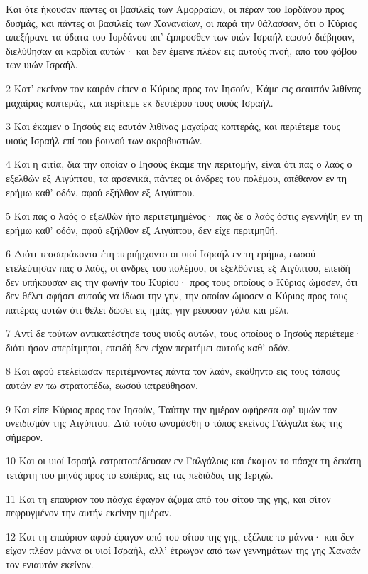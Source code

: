 \par Και ότε ήκουσαν πάντες οι βασιλείς των Αμορραίων, οι πέραν του Ιορδάνου προς δυσμάς, και πάντες οι βασιλείς των Χαναναίων, οι παρά την θάλασσαν, ότι ο Κύριος απεξήρανε τα ύδατα του Ιορδάνου απ' έμπροσθεν των υιών Ισραήλ εωσού διέβησαν, διελύθησαν αι καρδίαι αυτών· και δεν έμεινε πλέον εις αυτούς πνοή, από του φόβου των υιών Ισραήλ.
\par 2 Κατ' εκείνον τον καιρόν είπεν ο Κύριος προς τον Ιησούν, Κάμε εις σεαυτόν λιθίνας μαχαίρας κοπτεράς, και περίτεμε εκ δευτέρου τους υιούς Ισραήλ.
\par 3 Και έκαμεν ο Ιησούς εις εαυτόν λιθίνας μαχαίρας κοπτεράς, και περιέτεμε τους υιούς Ισραήλ επί του βουνού των ακροβυστιών.
\par 4 Και η αιτία, διά την οποίαν ο Ιησούς έκαμε την περιτομήν, είναι ότι πας ο λαός ο εξελθών εξ Αιγύπτου, τα αρσενικά, πάντες οι άνδρες του πολέμου, απέθανον εν τη ερήμω καθ' οδόν, αφού εξήλθον εξ Αιγύπτου.
\par 5 Και πας ο λαός ο εξελθών ήτο περιτετμημένος· πας δε ο λαός όστις εγεννήθη εν τη ερήμω καθ' οδόν, αφού εξήλθον εξ Αιγύπτου, δεν είχε περιτμηθή.
\par 6 Διότι τεσσαράκοντα έτη περιήρχοντο οι υιοί Ισραήλ εν τη ερήμω, εωσού ετελεύτησαν πας ο λαός, οι άνδρες του πολέμου, οι εξελθόντες εξ Αιγύπτου, επειδή δεν υπήκουσαν εις την φωνήν του Κυρίου· προς τους οποίους ο Κύριος ώμοσεν, ότι δεν θέλει αφήσει αυτούς να ίδωσι την γην, την οποίαν ώμοσεν ο Κύριος προς τους πατέρας αυτών ότι θέλει δώσει εις ημάς, γην ρέουσαν γάλα και μέλι.
\par 7 Αντί δε τούτων αντικατέστησε τους υιούς αυτών, τους οποίους ο Ιησούς περιέτεμε· διότι ήσαν απερίτμητοι, επειδή δεν είχον περιτέμει αυτούς καθ' οδόν.
\par 8 Και αφού ετελείωσαν περιτέμνοντες πάντα τον λαόν, εκάθηντο εις τους τόπους αυτών εν τω στρατοπέδω, εωσού ιατρεύθησαν.
\par 9 Και είπε Κύριος προς τον Ιησούν, Ταύτην την ημέραν αφήρεσα αφ' υμών τον ονειδισμόν της Αιγύπτου. Διά τούτο ωνομάσθη ο τόπος εκείνος Γάλγαλα έως της σήμερον.
\par 10 Και οι υιοί Ισραήλ εστρατοπέδευσαν εν Γαλγάλοις και έκαμον το πάσχα τη δεκάτη τετάρτη του μηνός προς το εσπέρας, εις τας πεδιάδας της Ιεριχώ.
\par 11 Και τη επαύριον του πάσχα έφαγον άζυμα από του σίτου της γης, και σίτον πεφρυγμένον την αυτήν εκείνην ημέραν.
\par 12 Και τη επαύριον αφού έφαγον από του σίτου της γης, εξέλιπε το μάννα· και δεν είχον πλέον μάννα οι υιοί Ισραήλ, αλλ' έτρωγον από των γεννημάτων της γης Χαναάν τον ενιαυτόν εκείνον.

